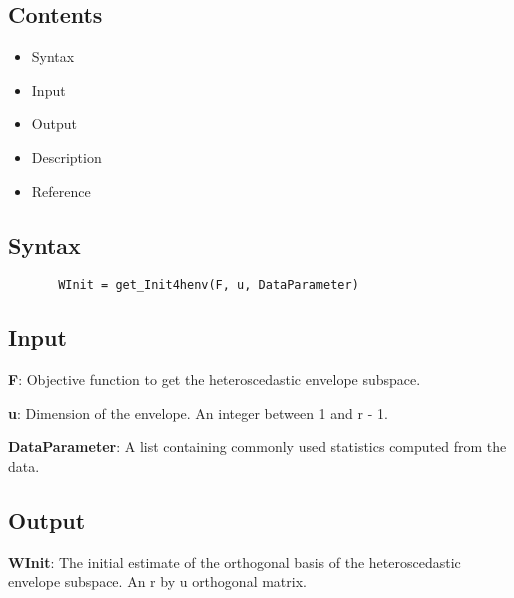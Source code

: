 \documentclass[a4paper,11pt,openany]{memoir}
\begin{document}
\subsection*{Contents}

\begin{itemize}
\setlength{\itemsep}{-1ex}
   \item Syntax
   \item Input
   \item Output
   \item Description
   \item Reference
\end{itemize}


\subsection*{Syntax}


\begin{verbatim}       WInit = get_Init4henv(F, u, DataParameter)\end{verbatim}
    

\subsection*{Input}

\begin{par}
\textbf{F}: Objective function to get the heteroscedastic envelope subspace.
\end{par} \vspace{1em}
\begin{par}
\textbf{u}: Dimension of the envelope. An integer between 1 and r - 1.
\end{par} \vspace{1em}
\begin{par}
\textbf{DataParameter}: A list containing commonly used statistics computed from the data.
\end{par} \vspace{1em}


\subsection*{Output}

\begin{par}
\textbf{WInit}: The initial estimate of the orthogonal basis of the heteroscedastic envelope subspace. An r by u orthogonal matrix.
\end{par} \vspace{1em}
\end{document}
